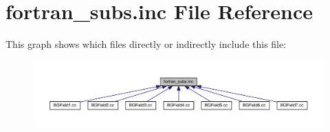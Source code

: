 \hypertarget{fortran__subs_8inc}{}\section{fortran\+\_\+subs.\+inc File Reference}
\label{fortran__subs_8inc}
This graph shows which files directly or indirectly include this file\+:
\nopagebreak
\begin{figure}[H]
\begin{center}
\leavevmode
\includegraphics[width=350pt]{fortran__subs_8inc__dep__incl}
\end{center}
\end{figure}
